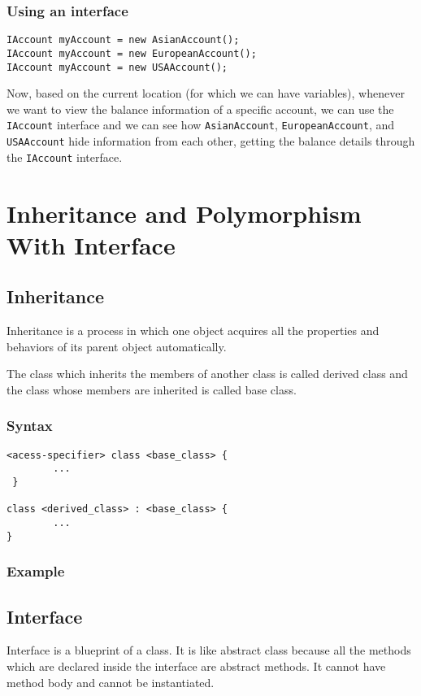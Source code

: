 \subsubsection*{Using an interface}

\begin{lstlisting}[numbers=none]
IAccount myAccount = new AsianAccount();
IAccount myAccount = new EuropeanAccount();
IAccount myAccount = new USAAccount();
\end{lstlisting}

Now, based on the current location (for which we can have variables), whenever we want
to view the balance information of a specific account, we can use the \texttt{IAccount} interface
and we can see how \texttt{AsianAccount}, \texttt{EuropeanAccount}, and \texttt{USAAccount} hide
information from each other, getting the balance details through the \texttt{IAccount} interface.

\section{Inheritance and Polymorphism With Interface}
\subsection*{Inheritance}
Inheritance is a process in which one object acquires all the properties and behaviors of its parent object automatically. 

 The class which inherits the members of another class is called derived class and the class whose members are inherited is called base class.
 
 \subsubsection*{Syntax}
 \begin{lstlisting}
<acess-specifier> class <base_class> {
 		...
 }
 	
class <derived_class> : <base_class> {
 		...
}
 \end{lstlisting}

\subsubsection*{Example}


 
\subsection*{Interface}
Interface is a blueprint of a class. It is like abstract class because all the methods which are declared inside the interface are abstract methods. It cannot have method body and cannot be instantiated.

